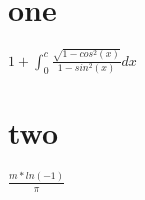\documentclass[letterpaper]{article}
\newcommand{\titleDOC}{}
\newcommand{\authorDOC}{Daniel Sabalakov}
\newcommand{\classDOC}{}
\begin{document}








\renewcommand{\titleDOC}{Enzyme Lab Report}

\renewcommand{\classDOC}{DE Intro to Biology I}

\renewcommand{\authorDOC}{Daniel Sabalakov}



\section{one}\label{one}

\(1+\int_{0}^{c} \frac{\sqrt{1-cos^2(x)}}{1-sin^2(x)} dx\)

\section{two}\label{two}

\(\frac{m*ln(-1)}{\pi}\)
\end{document}
